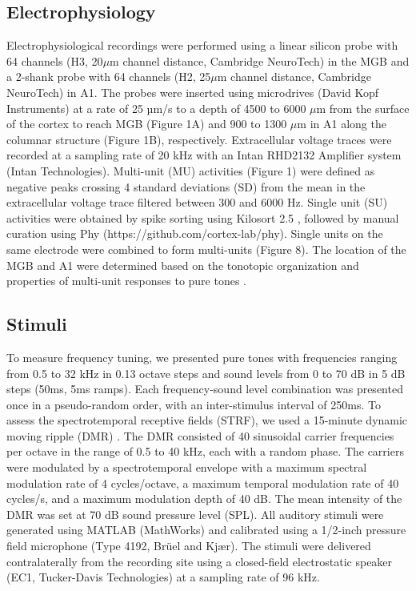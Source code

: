 \documentclass[11pt]{article}
\begin{document}
\subsection*{Electrophysiology}
Electrophysiological recordings were performed using a linear silicon probe with 64 channels (H3, 20$\mu$m channel distance, Cambridge NeuroTech) in the MGB and a 2-shank probe with 64 channels (H2, 25$\mu$m channel distance, Cambridge NeuroTech) in A1. The probes were inserted using microdrives (David Kopf Instruments) at a rate of 25 µm/s to a depth of 4500 to 6000 $\mu$m from the surface of the cortex to reach MGB (Figure 1A) and 900 to 1300 $\mu$m in A1 along the columnar structure (Figure 1B), respectively. Extracellular voltage traces were recorded at a sampling rate of 20 kHz with an Intan RHD2132 Amplifier system (Intan Technologies). Multi-unit (MU) activities (Figure 1) were defined as negative peaks crossing 4 standard deviations (SD) from the mean in the extracellular voltage trace filtered between 300 and 6000 Hz. Single unit (SU) activities were obtained by spike sorting using Kilosort 2.5 \citep{Steinmetz2021, Pachitariu2023}, followed by manual curation using Phy (https://github.com/cortex-lab/phy). Single units on the same electrode were combined to form multi-units (Figure 8). The location of the MGB and A1 were determined based on the tonotopic organization and properties of multi-unit responses to pure tones \citep{Polley2007, Anderson2011, Morel1987}.

\subsection*{Stimuli}
To measure frequency tuning, we presented pure tones with frequencies ranging from 0.5 to 32 kHz in 0.13 octave steps and sound levels from 0 to 70 dB in 5 dB steps (50ms, 5ms ramps). Each frequency-sound level combination was presented once in a pseudo-random order, with an inter-stimulus interval of 250ms. To assess the spectrotemporal receptive fields (STRF), we used a 15-minute dynamic moving ripple (DMR) \citep{Escabi2002}. The DMR consisted of 40 sinusoidal carrier frequencies per octave in the range of 0.5 to 40 kHz, each with a random phase. The carriers were modulated by a spectrotemporal envelope with a maximum spectral modulation rate of 4 cycles/octave, a maximum temporal modulation rate of 40 cycles/s, and a maximum modulation depth of 40 dB. The mean intensity of the DMR was set at 70 dB sound pressure level (SPL). All auditory stimuli were generated using MATLAB (MathWorks) and calibrated using a 1/2-inch pressure field microphone (Type 4192, Brüel and Kjær). The stimuli were delivered contralaterally from the recording site using a closed-field electrostatic speaker (EC1, Tucker-Davis Technologies) at a sampling rate of 96 kHz.
\end{document}
